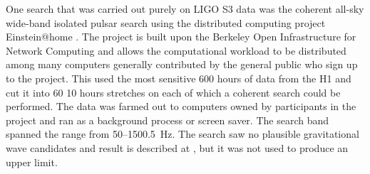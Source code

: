 \documentclass{article}
\begin{document}
One search that was carried out purely on LIGO S3 data was the coherent all-sky
wide-band isolated pulsar search using the distributed computing project
Einstein@home \cite{eath}. The project is built upon the Berkeley Open
Infrastructure for Network Computing \cite{BOINC} and allows the computational
workload to be distributed among many computers generally contributed by the
general public who sign up to the project. This used the most sensitive 600 
hours of data from the H1 and cut it into 60 10 hours stretches on each of which
a coherent search could be performed. The data was farmed out to computers owned
by participants in the project and ran as a background process or screen saver.
The search band spanned the range from 50--1500.5~Hz. The search saw no
plausible gravitational wave candidates and result is described at
\cite{eathS3}, but it was not used to produce an upper limit.
\end{document}

